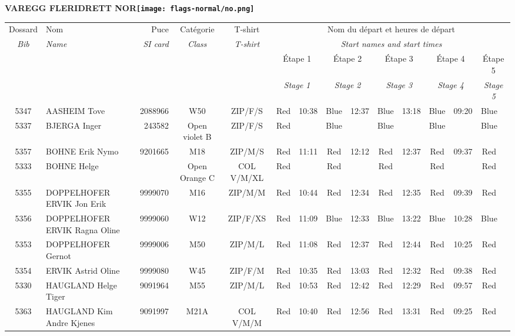 \documentclass{report}
\begin{document}
\newpage
  \Huge \centering \bfseries VAREGG FLERIDRETT  NOR\normalfont \footnotesize \sffamily \hfill \texttt{[image: flags-normal/no.png]} \newline 
  \begin{longtable}{|c|l|r|c|c|*{5}{cc|}}
    Dossard & Nom  & Puce    & Catégorie & T-shirt & \multicolumn{10}{c|}{Nom du départ et heures de départ} \\
    \itshape Bib     & \itshape Name & \itshape SI card & \itshape Class  & \itshape  T-shirt  & \multicolumn{10}{c|}{\itshape Start names and start times} \\
    \hline
    & & & & & \multicolumn{2}{c|}{Étape 1} & \multicolumn{2}{c|}{Étape 2} & \multicolumn{2}{c|}{Étape 3} & \multicolumn{2}{c|}{Étape 4} & \multicolumn{2}{c|}{Étape 5} \\
    & & & & & \multicolumn{2}{c|}{\itshape Stage 1} & \multicolumn{2}{c|}{\itshape Stage 2} & \multicolumn{2}{c|}{\itshape Stage 3} & \multicolumn{2}{c|}{\itshape Stage 4} & \multicolumn{2}{c|}{\itshape Stage 5} \\
    \hline
    5347 & AASHEIM Tove & 2088966 & W50 & ZIP/F/S & Red & 10:38 & Blue & 12:37 & Blue & 13:18 & Blue & 09:20 & Blue &  \\
    5337 & BJERGA Inger & 243582 & Open violet B & ZIP/F/S & Red &   & Blue &   & Blue &   & Blue &   & Blue &  \\
    5357 & BOHNE Erik Nymo & 9201665 & M18 & ZIP/M/S & Red & 11:11 & Red & 12:12 & Red & 12:37 & Red & 09:37 & Red &  \\
    5333 & BOHNE Helge &  & Open Orange C & COL V/M/XL & Red &   & Red &   & Red &   & Red &   & Red &  \\
    5355 & DOPPELHOFER ERVIK Jon Erik & 9999070 & M16 & ZIP/M/M & Red & 10:44 & Red & 12:34 & Red & 12:35 & Red & 09:39 & Red &  \\
    5356 & DOPPELHOFER ERVIK Ragna Oline & 9999060 & W12 & ZIP/F/XS & Red & 11:09 & Blue & 12:33 & Blue & 13:22 & Blue & 10:28 & Blue &  \\
    5353 & DOPPELHOFER Gernot & 9999006 & M50 & ZIP/M/L & Red & 11:08 & Red & 12:37 & Red & 12:44 & Red & 10:25 & Red &  \\
    5354 & ERVIK Astrid Oline & 9999080 & W45 & ZIP/F/M & Red & 10:35 & Red & 13:03 & Red & 12:32 & Red & 09:38 & Red &  \\
    5330 & HAUGLAND Helge Tiger & 9091964 & M55 & ZIP/M/L & Red & 10:53 & Red & 12:42 & Red & 12:29 & Red & 09:57 & Red &  \\
    5363 & HAUGLAND Kim Andre Kjenes & 9091997 & M21A & COL V/M/M & Red & 10:40 & Red & 12:56 & Red & 13:31 & Red & 09:25 & Red &  \\

\end{longtable}
\end{document}
